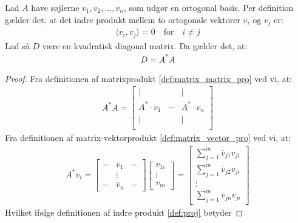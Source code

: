 \vspace{0.5cm}
\begin{theorem}
    Lad \( A \) have søjlerne \( v_1, v_2, \ldots, v_n \), som udgør en ortogonal basis. Per definition gælder det, at det indre produkt mellem to ortogonale vektorer \( v_i \) og \( v_j \) er:
    \begin{gather*}
        \langle v_i, v_j \rangle = 0 \quad \text{for} \quad i \neq j
    \end{gather*}
    Lad så \( D \) være en kvadratisk diagonal matrix. Da gælder det, at:
    \begin{gather*}
        D = A^* A
    \end{gather*}
\begin{proof}
    Fra definitionen af matrixprodukt \ref{def:matrix_matrix_pro} ved vi, at:
    \begin{gather*}
        A^*A = 
        \begin{bmatrix}
            | &  & | \\
            A^* \cdot v_1 & \cdots & A^* \cdot v_n \\
            | &  & | \\
        \end{bmatrix}
    \end{gather*}
    Fra definitionen af matrix-vektorprodukt \ref{def:matrix_vector_pro} ved vi, at:
    \begin{gather*}
        A^* v_i = 
        \begin{bmatrix}
            - & \overline{v}_{1} & - \\ 
            &\vdots& \\
            - & \overline{v}_{n} & - 
        \end{bmatrix}
        \begin{bmatrix}
            v_{1i} \\ \vdots \\ v_{ni}
        \end{bmatrix}
        =
        \begin{bmatrix}
            \sum_{j=1}^{m} \overline{v}_{j1}v_{ji} \\
            \sum_{j=1}^{m} \overline{v}_{j2}v_{ji} \\
            \vdots \\
            \sum_{j=1}^{m} \overline{v}_{jn}v_{ji}
        \end{bmatrix}
    \end{gather*}
    Hvilket ifølge definitionen af indre produkt \ref{def:proj} betyder 

\end{proof}
\end{theorem}
